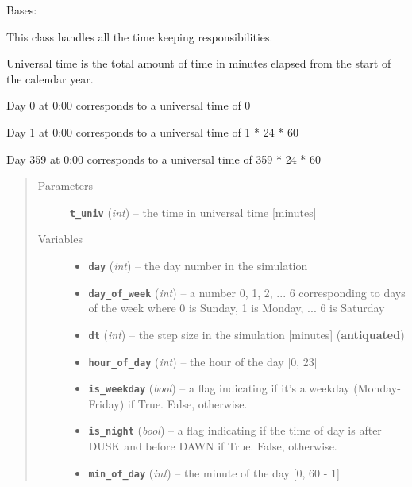 \documentclass[letterpaper,10pt,english]{sphinxmanual}
\begin{document}
\begin{fulllineitems}
\label{temporal:temporal.Temporal}
Bases: 

This class handles all the time keeping responsibilities.

Universal time is the total amount of time in minutes elapsed from the start of the
calendar year.

Day 0 at 0:00 corresponds to a universal time of 0

Day 1 at 0:00 corresponds to a universal time of 1 * 24 * 60

Day 359 at 0:00 corresponds to a universal time of 359 * 24 * 60
\begin{quote}\begin{description}
\item[{Parameters}] \leavevmode
\textbf{\texttt{t\_univ}} (\emph{int}) -- the time in universal time {[}minutes{]}

\item[{Variables}] \leavevmode\begin{itemize}
\item {} 
\textbf{\texttt{day}} (\emph{int}) -- the day number in the simulation

\item {} 
\textbf{\texttt{day\_of\_week}} (\emph{int}) -- a number 0, 1, 2, ... 6 corresponding to days of the week where 0 is Sunday, 1 is     Monday,  ... 6 is Saturday

\item {} 
\textbf{\texttt{dt}} (\emph{int}) -- the step size in the simulation {[}minutes{]} (\textbf{antiquated})

\item {} 
\textbf{\texttt{hour\_of\_day}} (\emph{int}) -- the hour of the day {[}0, 23{]}

\item {} 
\textbf{\texttt{is\_weekday}} (\emph{bool}) -- a flag indicating if it's a weekday (Monday-Friday) if True. False, otherwise.

\item {} 
\textbf{\texttt{is\_night}} (\emph{bool}) -- a flag indicating if the time of day is after DUSK and before DAWN if True.     False, otherwise.

\item {} 
\textbf{\texttt{min\_of\_day}} (\emph{int}) -- the minute of the day {[}0, 60 - 1{]}


\end{itemize}
\end{description}
\end{quote}
\end{fulllineitems}
\end{document}

